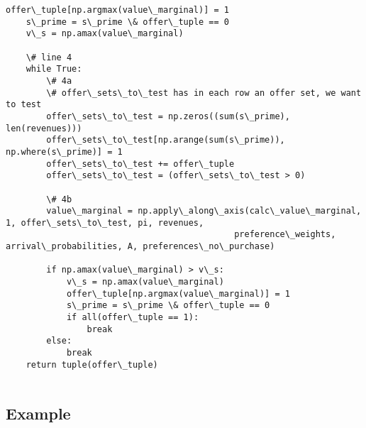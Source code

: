 \documentclass[11pt]{article}
\begin{document}
\begin{Verbatim}[commandchars=\\\{\}]
    offer\_tuple[np.argmax(value\_marginal)] = 1
    s\_prime = s\_prime \& offer\_tuple == 0
    v\_s = np.amax(value\_marginal)

    \# line 4
    while True:
        \# 4a
        \# offer\_sets\_to\_test has in each row an offer set, we want to test
        offer\_sets\_to\_test = np.zeros((sum(s\_prime), len(revenues)))
        offer\_sets\_to\_test[np.arange(sum(s\_prime)), np.where(s\_prime)] = 1
        offer\_sets\_to\_test += offer\_tuple
        offer\_sets\_to\_test = (offer\_sets\_to\_test > 0)

        \# 4b
        value\_marginal = np.apply\_along\_axis(calc\_value\_marginal, 1, offer\_sets\_to\_test, pi, revenues,
                                             preference\_weights, arrival\_probabilities, A, preferences\_no\_purchase)

        if np.amax(value\_marginal) > v\_s:
            v\_s = np.amax(value\_marginal)
            offer\_tuple[np.argmax(value\_marginal)] = 1
            s\_prime = s\_prime \& offer\_tuple == 0
            if all(offer\_tuple == 1):
                break
        else:
            break
    return tuple(offer\_tuple)


    \end{Verbatim}

    \subsection{Example}\label{example}
\end{document}
